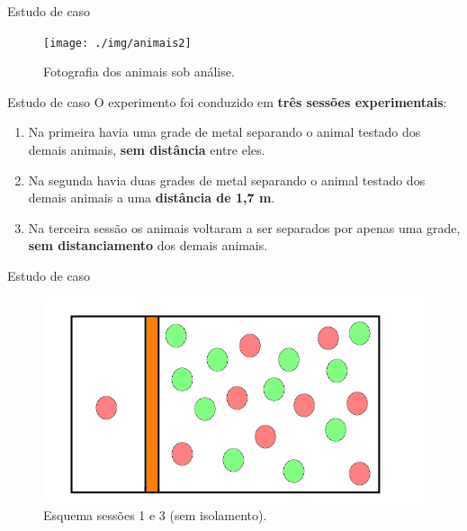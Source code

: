 \documentclass[
  ignorenonframetext,
  serif,
  professionalfont,
  usenames,
  dvipsnames,
  aspectratio = 169]{beamer}
\begin{document}
\begin{frame}{Estudo de caso}
\protect\hypertarget{estudo-de-caso-2}{}
\begin{figure}

{\centering \texttt{[image: ./img/animais2]} 

}

\caption{Fotografia dos animais sob análise.}\label{fig:unnamed-chunk-4}
\end{figure}
\end{frame}

\begin{frame}{Estudo de caso}
\protect\hypertarget{estudo-de-caso-3}{}
O experimento foi conduzido em \textbf{três sessões experimentais}:

\begin{enumerate}
\item
  Na primeira havia uma grade de metal separando o animal testado dos
  demais animais, \textbf{sem distância} entre eles.
\item
  Na segunda havia duas grades de metal separando o animal testado dos
  demais animais a uma \textbf{distância de 1,7 m}.
\item
  Na terceira sessão os animais voltaram a ser separados por apenas uma
  grade, \textbf{sem distanciamento} dos demais animais.
\end{enumerate}
\end{frame}

\begin{frame}{Estudo de caso}
\protect\hypertarget{estudo-de-caso-4}{}
\begin{figure}

{\centering \includegraphics[width=0.7\linewidth]{./img/se1_se3} 

}

\caption{Esquema sessões 1 e 3 (sem isolamento).}\label{fig:unnamed-chunk-5}
\end{figure}
\end{frame}
\end{document}
